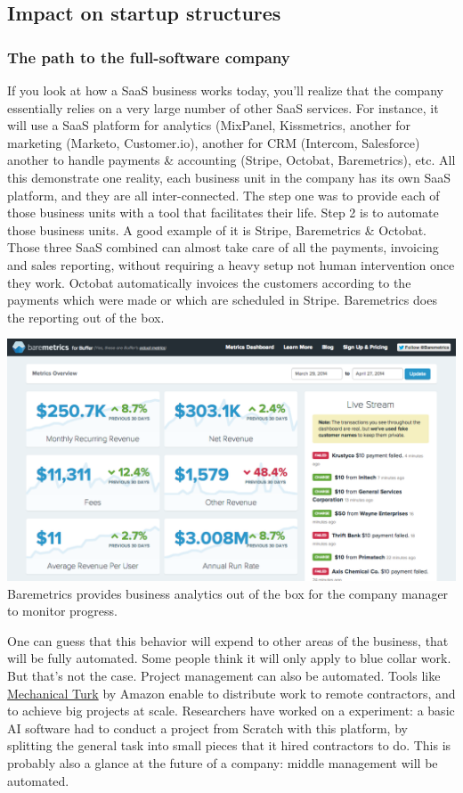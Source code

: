 \documentclass[12pt]{article}
\begin{document}
\subsection{Impact on startup structures}

\subsubsection{The path to the full-software company}

If you look at how a SaaS business works today, you'll realize that the company essentially relies on a very large number of other SaaS services. For instance, it will use a SaaS platform for analytics (MixPanel, Kissmetrics, another for marketing (Marketo, Customer.io), another for CRM (Intercom, Salesforce) another to handle payments \& accounting (Stripe, Octobat, Baremetrics), etc.
All this demonstrate one reality, each business unit in the company has its own SaaS platform, and they are all inter-connected. The step one was to provide each of those business units with a tool that facilitates their life. Step 2 is to automate those business units. A good example of it is Stripe, Baremetrics \& Octobat. Those three SaaS combined can almost take care of all the payments, invoicing and sales reporting, without requiring a heavy setup not human intervention once they work. Octobat automatically invoices the customers according to the payments which were made or which are scheduled in Stripe. Baremetrics does the reporting out of the box.

\smallskip
\includegraphics[width=\textwidth]{baremetrics}
Baremetrics provides business analytics out of the box for the company manager to monitor progress.

\smallskip

One can guess that this behavior will expend to other areas of the business, that will be fully automated. Some people think it will only apply to blue collar work. But that's not the case. Project management can also be automated. Tools like \href{https://www.mturk.com/mturk/welcome}{Mechanical Turk} by Amazon enable to distribute work to remote contractors, and to achieve big projects at scale. Researchers have worked on a experiment: a basic AI software had to conduct a project from Scratch with this platform, by splitting the general task into small pieces that it hired contractors to do. This is probably also a glance at the future of a company: middle management will be automated.
\end{document}
